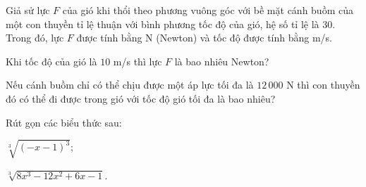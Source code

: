 \begin{exercises}
\begin{questions}[resume=SGK]
\begin{questions}
            \answerline
            \answerline
        \end{questions}

        \item Giả sử lực $F$ của gió khi thổi theo phương vuông góc với bề mặt cánh buồm của một con thuyền tỉ lệ thuận với bình phương tốc độ của gió, hệ số tỉ lệ là $30$. Trong đó, lực $F$ được tính bằng N (Newton) và tốc độ được tính bằng m/s.
        \begin{questions}
            \item Khi tốc độ của gió là $10$ m/s thì lực $F$ là bao nhiêu Newton?

            \answerline
            \answerline

            \item Nếu cánh buồm chỉ có thể chịu được một áp lực tối đa là $12\,000$ N thì con thuyền đó có thể đi được trong gió với tốc độ gió tối đa là bao nhiêu?

            \answerline
            \answerline
        \end{questions}

        \item Rút gọn các biểu thức sau:
        \begin{questions}
            \item $\sqrt[3]{(-x-1)^3}$;

            \answerline
            \answerline

            \item $\sqrt[3]{8x^3-12x^2+6x-1}$.

            \answerline
            \answerline
        \end{questions}
    \end{questions}
\end{exercises}
